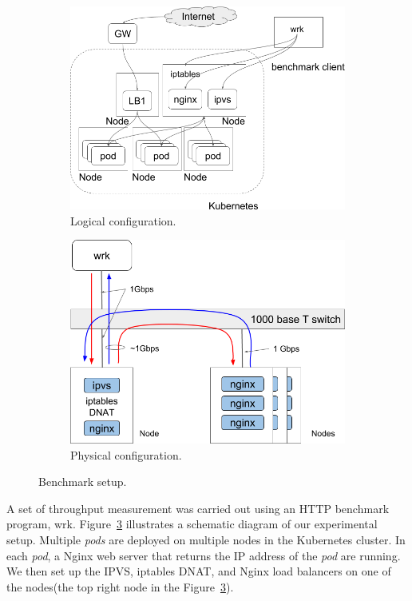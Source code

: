 \begin{figure}
\begin{subfigure}[t]{\columnwidth}
  \centering
  \includegraphics[width=0.8\columnwidth]{Figs/benchmark-schem}
  \caption{Logical configuration.}
  \label{fig:benchmark-schem}
\end{subfigure}

\begin{subfigure}[t]{\columnwidth}
  \centering
  \includegraphics[width=0.8\columnwidth]{Figs/bench_1g}
  \caption{Physical configuration.}
  \label{fig:bench_1g}
\end{subfigure}
  \caption{Benchmark setup. }
  \label{fig:benchmark-setup}
\end{figure}

A set of throughput measurement was carried out using an HTTP benchmark program, wrk\cite{Glozer2016}.
Figure~\ref{fig:benchmark-setup} illustrates a schematic diagram of our experimental setup.
Multiple {\em pods} are deployed on multiple nodes in the Kubernetes cluster. 
In each {\em pod}, a Nginx web server that returns the IP address of the {\em pod} are running.
We then set up the IPVS, iptables DNAT, and Nginx load balancers on one of the nodes(the top right node in the Figure~\ref{fig:benchmark-setup}). 

